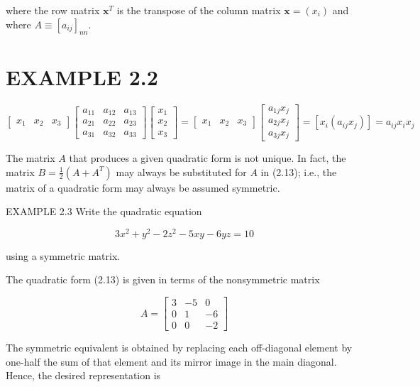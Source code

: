 \documentclass[10pt]{article}
\begin{document}
where the row matrix $\mathbf{x}^{T}$ is the transpose of the column matrix $\mathbf{x}=\left(x_{i}\right)$ and where $A \equiv\left[a_{i j}\right]_{n n}$.

\section*{EXAMPLE 2.2}
$$
\left[\begin{array}{lll}
x_{1} & x_{2} & x_{3}
\end{array}\right]\left[\begin{array}{lll}
a_{11} & a_{12} & a_{13} \\
a_{21} & a_{22} & a_{23} \\
a_{31} & a_{32} & a_{33}
\end{array}\right]\left[\begin{array}{l}
x_{1} \\
x_{2} \\
x_{3}
\end{array}\right]=\left[\begin{array}{lll}
x_{1} & x_{2} & x_{3}
\end{array}\right]\left[\begin{array}{l}
a_{1 j} x_{j} \\
a_{2 j} x_{j} \\
a_{3 j} x_{j}
\end{array}\right]=\left[x_{i}\left(a_{i j} x_{j}\right)\right]=a_{i j} x_{i} x_{j}
$$

The matrix $A$ that produces a given quadratic form is not unique. In fact, the matrix $B=\frac{1}{2}\left(A+A^{T}\right)$ may always be substituted for $A$ in (2.13); i.e., the matrix of a quadratic form may always be assumed symmetric.

EXAMPLE 2.3 Write the quadratic equation

$$
3 x^{2}+y^{2}-2 z^{2}-5 x y-6 y z=10
$$

using a symmetric matrix.

The quadratic form (2.13) is given in terms of the nonsymmetric matrix

$$
A=\left[\begin{array}{rrr}
3 & -5 & 0 \\
0 & 1 & -6 \\
0 & 0 & -2
\end{array}\right]
$$

The symmetric equivalent is obtained by replacing each off-diagonal element by one-half the sum of that element and its mirror image in the main diagonal. Hence, the desired representation is
\end{document}
